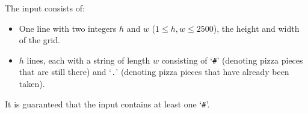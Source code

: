 
  The input consists of:
  \begin{itemize}
    \item One line with two integers $h$ and $w$ ($1 \le h,w \le 2500$), the height and width of the grid.
    \item $h$ lines, each with a string of length $w$ consisting of `\texttt{\#}' (denoting pizza pieces that are still there) and `\texttt{.}' (denoting pizza pieces that have already been taken).
  \end{itemize}
  It is guaranteed that the input contains at least one `\texttt{\#}'.


\vspace{-3mm}
